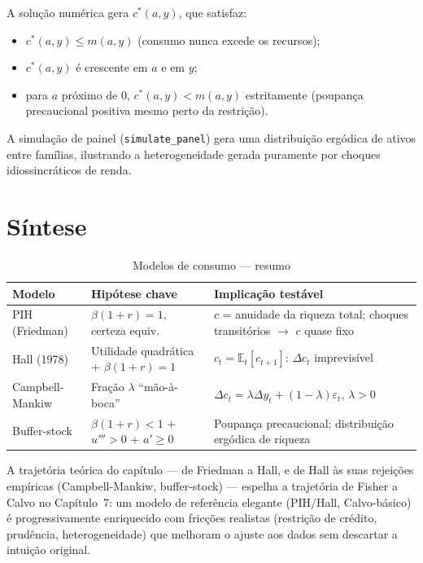 \documentclass[11pt,a4paper]{article}
\newcommand{\E}{\mathbb{E}}
\begin{document}
A solução numérica gera $c^*(a,y)$, que satisfaz:
\begin{itemize}
  \item $c^*(a,y) \le m(a,y)$ (consumo nunca excede os recursos);
  \item $c^*(a,y)$ é crescente em $a$ e em $y$;
  \item para $a$ próximo de $0$, $c^*(a,y) < m(a,y)$ estritamente
    (poupança precaucional positiva mesmo perto da restrição).
\end{itemize}

A simulação de painel (\texttt{simulate\_panel}) gera uma distribuição
ergódica de ativos entre famílias, ilustrando a heterogeneidade gerada
puramente por choques idiossincráticos de renda.

\section{Síntese}

\begin{table}[h!]
  \centering
  \caption{Modelos de consumo --- resumo}
  \begin{tabular}{lll}
    \toprule
    Modelo & Hipótese chave & Implicação testável \\
    \midrule
    PIH (Friedman) & $\beta(1+r)=1$, certeza equiv. &
      $c$ = anuidade da riqueza total; choques transitórios $\to$ $c$ quase fixo \\
    Hall (1978) & Utilidade quadrática + $\beta(1+r)=1$ &
      $c_t = \E_t[c_{t+1}]$: $\Delta c_t$ imprevisível \\
    Campbell-Mankiw & Fração $\lambda$ ``mão-à-boca'' &
      $\Delta c_t = \lambda \Delta y_t + (1-\lambda)\varepsilon_t$, $\lambda>0$ \\
    Buffer-stock & $\beta(1+r)<1$ + $u'''>0$ + $a'\ge 0$ &
      Poupança precaucional; distribuição ergódica de riqueza \\
    \bottomrule
  \end{tabular}
\end{table}

\noindent A trajetória teórica do capítulo --- de Friedman a Hall, e
de Hall às suas rejeições empíricas (Campbell-Mankiw, buffer-stock) ---
espelha a trajetória de Fisher a Calvo no Capítulo~7: um modelo de
referência elegante (PIH/Hall, Calvo-básico) é progressivamente
enriquecido com fricções realistas (restrição de crédito, prudência,
heterogeneidade) que melhoram o ajuste aos dados sem descartar a
intuição original.
\end{document}
